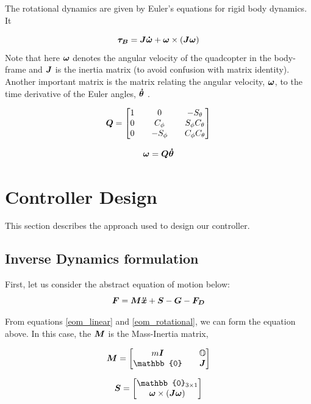 \documentclass[12pt,fleqn]{article}
\newcommand{\mbm}[1]{\mbox{\boldmath $#1$}}
\begin{document}
The rotational dynamics are given by Euler's equations for rigid body
dynamics. It

\begin{equation} \label{eom_rotational}
\mbm{\tau_B} = \mbm{J\dot{\omega}} + \mbm{\omega} \times (\mbm{J\omega})
\end{equation}
Note that here $\mbm{\omega}$ denotes the angular velocity of the
quadcopter in the body-frame and $\mbm{J}$ is the inertia matrix (to
avoid confusion with matrix identity).\\

Another important matrix is the matrix relating the angular velocity,
$\mbm{\omega}$, to the time derivative of the Euler angles,
$\mbm{\dot{\theta}}$ \cite{Andrew}. 

$$ \mbm{Q} = \begin{bmatrix} 1 && 0 && -S_{\theta} \\
0 && C_\phi && S_\phi C_\theta \\ 0 && -S_\phi && C_\phi C_\theta \end{bmatrix} $$

$$ \mbm{\omega} = \mbm{Q} \mbm{\dot{\theta}} $$

\section{Controller Design}
This section describes the approach used to design our controller.

\subsection{Inverse Dynamics formulation}
First, let us consider the abstract equation of motion below:
\begin{equation} \label{eom_abstract}
$$ \mbm{F} = \mbm{M}\mbm{\ddot{x}} + \mbm{S} -\mbm{G} - \mbm{F_D} $$
\end{equation}

From equations \ref{eom_linear} and \ref{eom_rotational}, we can form
the equation above. In this case, the $\mbm{M}$ is the Mass-Inertia
matrix, 

$$ \mbm{M} = \begin{bmatrix} m\mbm{I} && \mathbb{O}\\ \mathbb{0}&&
  \mbm{J}\end{bmatrix} $$

$$ \mbm{S} = \begin{bmatrix} \mathbb{0}_{3\times1} \\ \mbm{\omega} \times
  (\mbm{J\omega}) \end{bmatrix} $$
\end{document}
